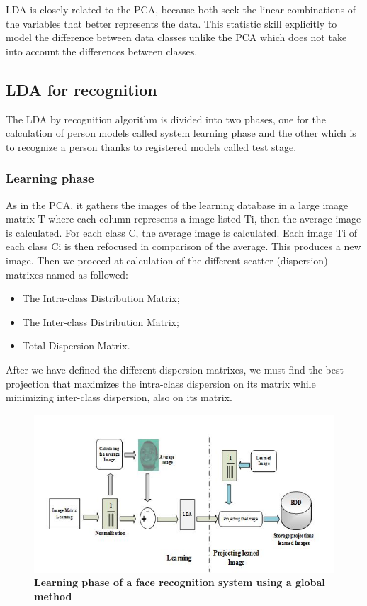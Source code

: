 LDA is closely related to the PCA, because both seek the linear combinations of the variables that better represents the data. This statistic skill explicitly to model the difference between data classes unlike the PCA which does not take into account the differences between classes.
\subsection{LDA for recognition}
The LDA by recognition algorithm is divided into two phases, one for the calculation of person  models called system learning phase and the other which is to recognize a person thanks to registered models called test stage.
\subsubsection{Learning phase}
As in the PCA, it gathers the images of the learning database in a large image matrix T where each column represents a image listed Ti, then the average image is calculated.
For each class C, the average image is calculated.
Each image Ti of each class Ci is then refocused in comparison of the average. This produces a new image.
Then we proceed at calculation of the different scatter (dispersion) matrixes named as followed:
\begin{itemize}
 

\item The Intra-class Distribution Matrix;
\item The Inter-class Distribution Matrix;
\item Total Dispersion Matrix.
\end{itemize}
After we have defined the different dispersion matrixes, we must find the best projection that maximizes the intra-class dispersion on its matrix while minimizing inter-class dispersion, also on its matrix.

\clearpage
\begin{figure}[bth]%
\begin{center}
\includegraphics[scale=0.75]{learningPhaseGM}%
\caption{\textbf{Learning phase of a face recognition system using a global method}}%
\label{learningPhaseGM}%
\end {center}
\end{figure}
